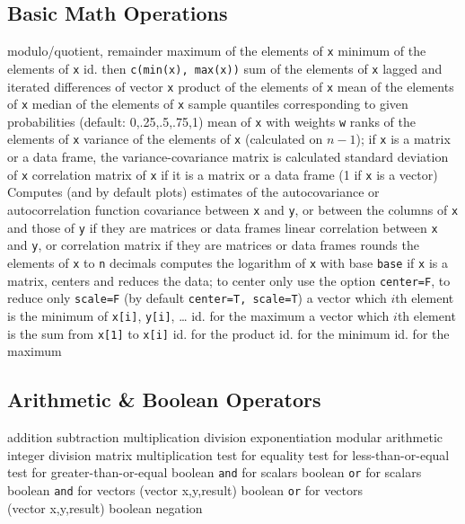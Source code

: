\subsection{Basic Math Operations}{}
\cmdS{\%\%, \%/\%}	{modulo/quotient, remainder}
	{ maximum of the elements of {\tt x}}
	{ minimum of the elements of {\tt x}}
	{ id. then {\tt c(min(x), max(x))}}
	{ sum of the elements of {\tt x}}
	{ lagged and iterated differences of vector {\tt x}}
	{ product of the elements of {\tt x}}
	{ mean of the elements of {\tt x}}
	{ median of the elements of {\tt x}}
	{sample quantiles corresponding to given
    probabilities (default: 0,.25,.5,.75,1)}
	{mean of {\tt x} with weights {\tt w}}
	{ ranks of the elements of {\tt x}}
	{variance of the elements of {\tt x}
    (calculated on $n-1$); if {\tt x} is a matrix or a data frame, the
    variance-covariance matrix is calculated}
	{standard deviation of {\tt x}}
	{correlation matrix of {\tt x} if it is a matrix or a data frame (1 if {\tt x} is a vector)}
	{Computes (and by default plots) estimates of the autocovariance or autocorrelation function}
	{covariance between {\tt x} and {\tt y}, or between the columns of {\tt x} and those of {\tt y} if they are matrices or data frames}
	{linear correlation between {\tt x} and {\tt y}, or correlation matrix if they are matrices or data frames}
	{rounds the elements of {\tt x} to {\tt n} decimals}
	{computes the logarithm of {\tt x} with base {\tt base}}
	{if {\tt x} is a matrix, centers and reduces the data; to
center only use the option {\tt center=F}, to reduce only {\tt scale=F}
(by default {\tt center=T, scale=T})}
	{ a vector which $i$th element is the minimum of {\tt x[i]}, {\tt y[i]}, \ldots}
	{ id. for the maximum}
	{a vector which $i$th element is the sum from {\tt x[1]} to {\tt x[i]}}
	{ id. for the product}
	{ id. for the minimum}
	{ id. for the maximum}

\subsection{Arithmetic \& Boolean Operators}{}
	{addition}
	{subtraction}
	{multiplication}
	{division}
	{exponentiation}
	{modular arithmetic}
	{integer division}
	{matrix multiplication}
	{test for equality}
	{test for less-than-or-equal}
	{test for greater-than-or-equal}
	{boolean {\tt and} for scalars}
	{boolean {\tt or} for scalars}
	{boolean {\tt and} for vectors (vector x,y,result)}
	{boolean {\tt or} for vectors\\(vector x,y,result)}
	{boolean negation}

